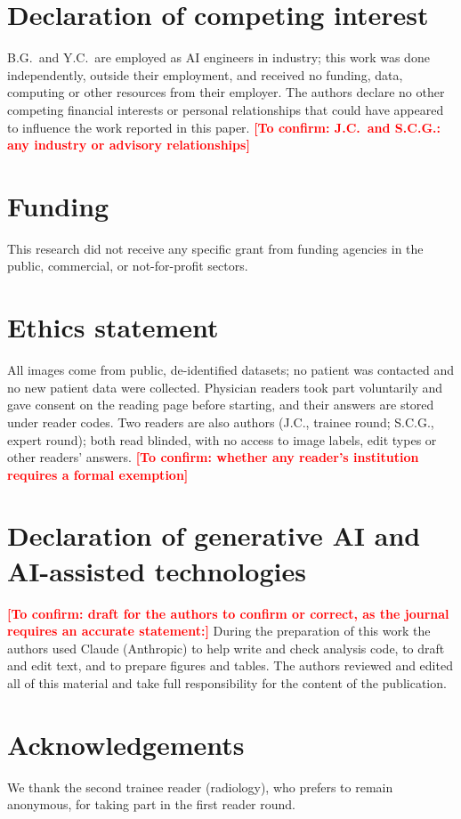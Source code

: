 \documentclass[5p,times,twocolumn,authoryear]{elsarticle}
\newcommand{\toconfirm}[1]{\textcolor{red}{\textbf{[To confirm: #1]}}}
\begin{document}
\section*{Declaration of competing interest}
B.G.\ and Y.C.\ are employed as AI engineers in industry; this work was done independently, outside their employment, and received no funding, data, computing or other resources from their employer. The authors declare no other competing financial interests or personal relationships that could have appeared to influence the work reported in this paper. \toconfirm{J.C.\ and S.C.G.: any industry or advisory relationships}

\section*{Funding}
This research did not receive any specific grant from funding agencies in the public, commercial, or not-for-profit sectors.

\section*{Ethics statement}
All images come from public, de-identified datasets; no patient was contacted and no new patient data were collected. Physician readers took part voluntarily and gave consent on the reading page before starting, and their answers are stored under reader codes. Two readers are also authors (J.C., trainee round; S.C.G., expert round); both read blinded, with no access to image labels, edit types or other readers' answers. \toconfirm{whether any reader's institution requires a formal exemption}

\section*{Declaration of generative AI and AI-assisted technologies}
\toconfirm{draft for the authors to confirm or correct, as the journal requires an accurate statement:} During the preparation of this work the authors used Claude (Anthropic) to help write and check analysis code, to draft and edit text, and to prepare figures and tables. The authors reviewed and edited all of this material and take full responsibility for the content of the publication.

\section*{Acknowledgements}
We thank the second trainee reader (radiology), who prefers to remain anonymous, for taking part in the first reader round.
\end{document}
